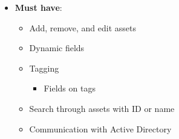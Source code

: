\begin{itemize}
    \item \textbf{Must have}:
        \begin{itemize}
        \item Add, remove, and edit assets
        \item Dynamic fields
        \item Tagging
            \begin{itemize}
                \item Fields on tags
            \end{itemize}
        \item Search through assets with ID or name
        \item Communication with Active Directory
    \end{itemize}
    

\end{itemize}

